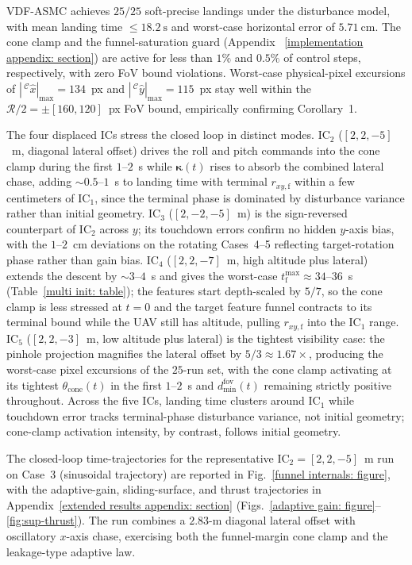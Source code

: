 \documentclass{IEEEtaes}
\begin{document}
VDF-ASMC achieves $25/25$ soft-precise landings under the disturbance model, with mean landing time $\le 18.2~\text{s}$ and worst-case horizontal error of $5.71~\text{cm}$. The cone clamp and the funnel-saturation guard (Appendix~
\ref{implementation appendix: section}) are active for less than $1\%$ and $0.5\%$ of control steps, respectively, with zero FoV bound violations. Worst-case physical-pixel excursions of $|\,^\mathcal{C}\hat{x}|_{\max}=134$~px and $|\,^\mathcal{C}\hat{y}|_{\max}=115$~px stay well within the $\mathcal{R}/2=\pm[160,120]$~px FoV bound, empirically confirming Corollary~1.

The four displaced ICs stress the closed loop in distinct modes. IC$_2$ ($[2,2,-5]$~m, diagonal lateral offset) drives the roll and pitch commands into the cone clamp during the first $1$--$2$~s while $\boldsymbol{\kappa}(t)$ rises to absorb the combined lateral chase, adding $\sim 0.5$--$1$~s to landing time with terminal $r_{xy,\text{f}}$ within a few centimeters of IC$_1$, since the terminal phase is dominated by disturbance variance rather than initial geometry. IC$_3$ ($[2,-2,-5]$~m) is the sign-reversed counterpart of IC$_2$ across $y$; its touchdown errors confirm no hidden $y$-axis bias, with the $1$--$2$~cm deviations on the rotating Cases~4--5 reflecting target-rotation phase rather than gain bias. IC$_4$ ($[2,2,-7]$~m, high altitude plus lateral) extends the descent by $\sim 3$--$4$~s and gives the worst-case $t_\text{f}^{\max}\approx 34$--$36$~s (Table~\ref{multi init: table}); the features start depth-scaled by $5/7$, so the cone clamp is less stressed at $t=0$ and the target feature funnel contracts to its terminal bound while the UAV still has altitude, pulling $r_{xy,\text{f}}$ into the IC$_1$ range. IC$_5$ ($[2,2,-3]$~m, low altitude plus lateral) is the tightest visibility case: the pinhole projection magnifies the lateral offset by $5/3\approx 1.67\times$, producing the worst-case pixel excursions of the $25$-run set, with the cone clamp activating at its tightest $\theta_\text{cone}(t)$ in the first $1$--$2$~s and $d_\text{min}^\text{fov}(t)$ remaining strictly positive throughout. Across the five ICs, landing time clusters around IC$_1$ while touchdown error tracks terminal-phase disturbance variance, not initial geometry; cone-clamp activation intensity, by contrast, follows initial geometry.

The closed-loop time-trajectories for the representative IC$_2=[2,2,-5]$~m run on Case~3 (sinusoidal trajectory) are reported in Fig.~\ref{funnel internals: figure}, with the adaptive-gain, sliding-surface, and thrust trajectories in Appendix~\ref{extended results appendix: section} (Figs.~\ref{adaptive gain: figure}--\ref{fig:sup-thrust}). The run combines a $2.83$-m diagonal lateral offset with oscillatory $x$-axis chase, exercising both the funnel-margin cone clamp and the leakage-type adaptive law.
\end{document}
